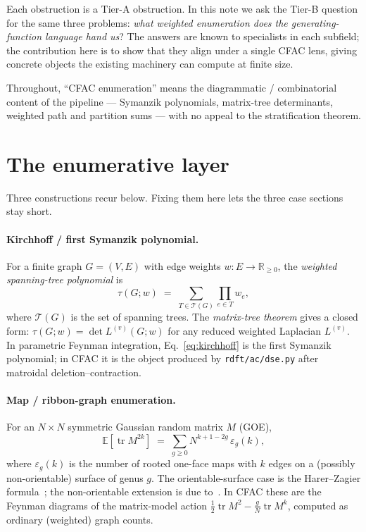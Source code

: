 \documentclass[10pt,a4paper,twocolumn]{article}
\theoremstyle{plain}
\theoremstyle{definition}
\newcommand{\Tree}{\tau}
\newcommand{\Tr}{\operatorname{tr}}
\newcommand{\Ex}{\mathbb{E}}
\begin{document}
Each obstruction is a Tier-A obstruction.  In this note we ask the
Tier-B question for the same three problems: \emph{what weighted
enumeration does the generating-function language hand us}?  The
answers are known to specialists in each subfield; the contribution
here is to show that they align under a single CFAC lens, giving
concrete objects the existing machinery can compute at finite size.

Throughout, ``CFAC enumeration'' means the diagrammatic /
combinatorial content of the pipeline --- Symanzik polynomials,
matrix-tree determinants, weighted path and partition sums --- with
no appeal to the stratification theorem.

\section{The enumerative layer}
\label{sec:enumerative}

Three constructions recur below.  Fixing them here lets the three case
sections stay short.

\paragraph{Kirchhoff / first Symanzik polynomial.}  For a finite
graph $G = (V, E)$ with edge weights $w : E \to \mathbb{R}_{\geq 0}$,
the \emph{weighted spanning-tree polynomial} is
\begin{equation}
  \Tree(G; w) \;=\; \sum_{T \in \mathcal{T}(G)} \prod_{e \in T} w_e,
  \label{eq:kirchhoff}
\end{equation}
where $\mathcal{T}(G)$ is the set of spanning trees.  The
\emph{matrix-tree theorem} gives a closed form:
$\Tree(G; w) = \det L^{(v)}(G; w)$ for any reduced weighted Laplacian
$L^{(v)}$.  In parametric Feynman integration,
Eq.~\eqref{eq:kirchhoff} is the first Symanzik polynomial; in CFAC
it is the object produced by \texttt{rdft/ac/dse.py} after
matroidal deletion--contraction.

\paragraph{Map / ribbon-graph enumeration.}  For an
$N \times N$ symmetric Gaussian random matrix $M$ (GOE),
\begin{equation}
  \Ex[\Tr M^{2k}] \;=\; \sum_{g \geq 0} N^{k+1-2g} \, \varepsilon_g(k),
\end{equation}
where $\varepsilon_g(k)$ is the number of rooted one-face maps with $k$
edges on a (possibly non-orientable) surface of genus $g$.  The
orientable-surface case is the Harer--Zagier
formula~\citep{HarerZagier1986}; the non-orientable extension is due
to~\citep{GouldenJackson1997}.  In CFAC these are the Feynman
diagrams of the matrix-model action $\tfrac12 \Tr M^2 - \tfrac{g}{N}
\Tr M^k$, computed as ordinary (weighted) graph counts.
\end{document}
